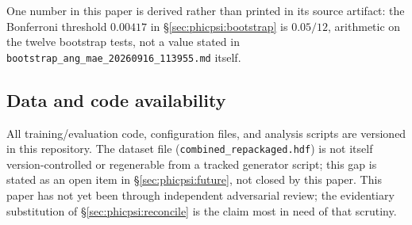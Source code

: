 One number in this paper is derived rather than printed in its source artifact: the Bonferroni threshold $0.00417$ in \S\ref{sec:phicpsi:bootstrap} is $0.05/12$, arithmetic on the twelve bootstrap tests, not a value stated in \texttt{bootstrap\_ang\_mae\_20260916\_113955.md} itself.

\subsection*{Data and code availability}
All training/evaluation code, configuration files, and analysis scripts are versioned in this repository.
The dataset file (\texttt{combined\_repackaged.hdf}) is not itself version-controlled or regenerable from a tracked generator script; this gap is stated as an open item in \S\ref{sec:phicpsi:future}, not closed by this paper.
This paper has not yet been through independent adversarial review; the evidentiary substitution of \S\ref{sec:phicpsi:reconcile} is the claim most in need of that scrutiny.
